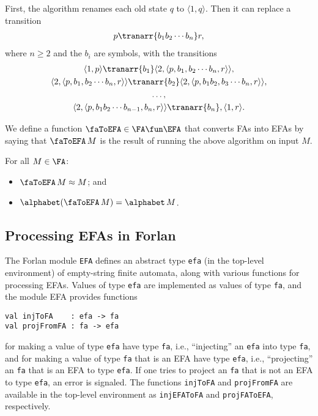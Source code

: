 First, the algorithm renames each old state $q$ to
$\langle 1,q\rangle$.  Then it can replace a transition
\begin{gather*}
p\tranarr{b_1b_2\cdots b_n}r,
\end{gather*}
where $n\geq 2$ and the $b_i$ are symbols, with the transitions
\begin{gather*}
\langle 1,p\rangle\tranarr{b_1}
\langle 2,\langle p,b_1,b_2\cdots b_n,r\rangle\rangle, \\
\langle 2,\langle p,b_1,b_2\cdots b_n,r\rangle\rangle\tranarr{b_2}
\langle 2,\langle p,b_1b_2,b_3\cdots b_n,r\rangle\rangle, \\
\ldots,\\
\langle 2,\langle p,b_1b_2\cdots b_{n-1},b_n,r\rangle\rangle\tranarr{b_n},
\langle 1,r\rangle.
\end{gather*}

We define a function $\faToEFA\in\FA\fun\EFA$ that converts FAs into
EFAs by saying that $\faToEFA\,M$ is the result of running the above
algorithm on input $M$.

\begin{theorem}
For all $M\in\FA$:
\begin{itemize}
\item $\faToEFA\,M\approx M$; and

\item $\alphabet(\faToEFA\,M) = \alphabet\,M$.
\end{itemize}
\end{theorem}

\subsection{Processing EFAs in Forlan}

The Forlan module \texttt{EFA} defines an abstract type \texttt{efa}
(in the top-level environment) of empty-string finite automata,
along with various functions for processing EFAs.
Values of type \texttt{efa} are implemented as values of type \texttt{fa}, and
the module EFA provides functions
\begin{verbatim}
val injToFA    : efa -> fa
val projFromFA : fa -> efa
\end{verbatim}
for making a value of type \texttt{efa} have type \texttt{fa}, i.e.,
``injecting'' an \texttt{efa} into type \texttt{fa}, and for
making a value of type \texttt{fa} that is an EFA have type
\texttt{efa}, i.e., ``projecting'' an \texttt{fa} that is an EFA to
type \texttt{efa}.  If one tries to project an \texttt{fa} that is not
an EFA to type \texttt{efa}, an error is signaled.  The functions
\texttt{injToFA} and \texttt{projFromFA} are available in the top-level
environment as \texttt{injEFAToFA} and \texttt{projFAToEFA}, respectively.

